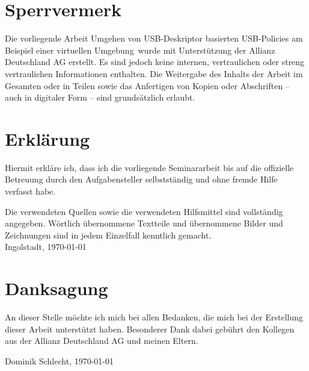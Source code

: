 


\chapter*{Sperrvermerk}
Die vorliegende Arbeit \glqq Umgehen von USB-Deskriptor basierten USB-Policies am Beispiel einer virtuellen Umgebung\grqq\ wurde mit Unterstützung der Allianz Deutschland AG erstellt. Es sind jedoch keine internen, vertraulichen oder streng vertraulichen Informationen enthalten. Die Weitergabe des Inhalts der Arbeit im Gesamten oder in Teilen sowie das Anfertigen von Kopien oder Abschriften -- auch in digitaler Form -- sind grunds\"{a}tzlich erlaubt.

\chapter*{Erkl\"{a}rung}
Hiermit erkl\"{a}re ich, dass ich die vorliegende Seminararbeit bis auf die offizielle Betreuung durch den Aufgabensteller selbstst\"{a}ndig und ohne fremde Hilfe verfasst habe.\par
Die verwendeten Quellen sowie die verwendeten Hilfsmittel sind vollst\"{a}ndig angegeben. W\"{o}rtlich \"{u}bernommene Textteile und \"{u}bernommene Bilder und Zeichnungen sind in jedem Einzelfall kenntlich gemacht. \\[10ex]
Ingolstadt, \today
{}

\chapter*{Danksagung}
An dieser Stelle möchte ich mich bei allen Bedanken, die mich bei der Erstellung dieser Arbeit unterstützt haben. Besonderer Dank dabei gebührt den Kollegen aus der Allianz Deutschland AG und meinen Eltern.

\begin{flushright}
\sffamily Dominik Schlecht, \today
\end{flushright}


